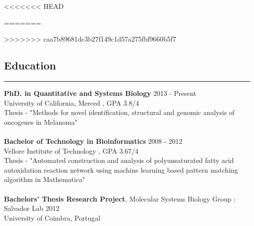 \documentclass[line,margin]{cv_type2}
\begin{document}
<<<<<<< HEAD
\address{  your@email.com \\ (123) 456-7890 }
=======
\address{  your_email \\ (123) 456-7890 }
>>>>>>> caa7b89681dc3b27f149c1d57a275fbf9660b5f7
\address{ \href {http://rgupta.in} {www.rgupta.in} \\  \href {http://github.com/rg-code} {github.com/rg-code}}

\begin{resume}

\section{Education}\hskip 4pt {\hfill \color{gray} \rule{14.7 cm}{0.1 pt}}
\begin{itemize}
                    {\textbf{PhD. in Quantitative and Systems Biology}} {\color{gray} \hfill 2013 - Present}\\
                    {University of California, Merced} {, GPA 3.8/4}\\
                    {\small{ Thesis} - "Methods for novel identification, structural and genomic analysis of oncogenes in  Melanoma"}
                    \\
                    \\
                    {\textbf{Bachelor of Technology in Bioinformatics }} {\color{gray} \hfill 2008 - 2012}\\
                    Vellore Institute of Technology , GPA 3.67/4 \\
                    {\small{ Thesis} - "Automated construction and analysis of polyunsaturated fatty acid autoxidation reaction network using machine learning based pattern matching algorithm in Mathematica"}
                    \\
                    \\
                    {\textbf{Bachelors' Thesis Research Project}}, { Molecular Systems Biology Group ; Salvador Lab}{\color{gray} \hfill 2012} \\
                    University of Coimbra, Portugal
		            
\end{itemize}
		            \vskip 12pt
		            

\end{resume}
\end{document}
